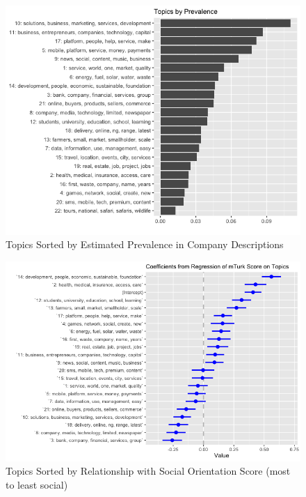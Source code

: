 \documentclass[12pt]{article}
\begin{document}
\begin{figure} [!htb]
\centering
\includegraphics[scale=0.5]{topic_prevalence}
\caption{Topics Sorted by Estimated Prevalence in Company Descriptions}
\end{figure}

\begin{figure} [!htb]
\centering
\includegraphics[scale=0.5]{topics_coefplot}
\caption{Topics Sorted by Relationship with Social Orientation Score (most to least social)}
\end{figure}
\end{document}

